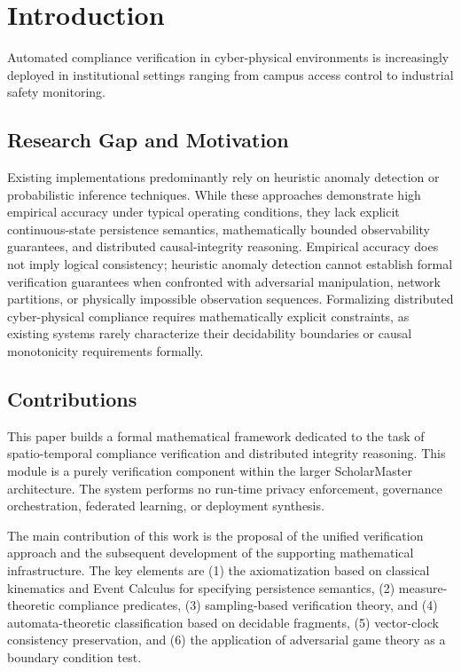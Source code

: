 \documentclass[conference]{IEEEtran}
\begin{document}
\section{Introduction}
Automated compliance verification in cyber-physical environments is increasingly deployed in institutional settings ranging from campus access control to industrial safety monitoring.

\subsection{Research Gap and Motivation}
Existing implementations predominantly rely on heuristic anomaly detection \cite{b1} or probabilistic inference techniques. While these approaches demonstrate high empirical accuracy under typical operating conditions, they lack explicit continuous-state persistence semantics, mathematically bounded observability guarantees, and distributed causal-integrity reasoning. Empirical accuracy does not imply logical consistency; heuristic anomaly detection cannot establish formal verification guarantees when confronted with adversarial manipulation, network partitions, or physically impossible observation sequences. Formalizing distributed cyber-physical compliance requires mathematically explicit constraints, as existing systems rarely characterize their decidability boundaries or causal monotonicity requirements formally.

\subsection{Contributions}
This paper builds a formal mathematical framework dedicated to the task of spatio-temporal compliance verification and distributed integrity reasoning. This module is a purely verification component within the larger ScholarMaster architecture. The system performs no run-time privacy enforcement, governance orchestration, federated learning, or deployment synthesis.

The main contribution of this work is the proposal of the unified verification approach and the subsequent development of the supporting mathematical infrastructure. The key elements are (1) the axiomatization based on classical kinematics and Event Calculus for specifying persistence semantics, (2) measure-theoretic compliance predicates, (3) sampling-based verification theory, and (4) automata-theoretic classification based on decidable fragments, (5) vector-clock consistency preservation, and (6) the application of adversarial game theory as a boundary condition test.
\end{document}
